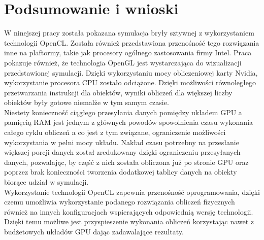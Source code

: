 \chapter{Podsumowanie i wnioski}

W ninejszej pracy została pokazana symulacja bryły sztywnej z wykorzystaniem technologii OpenCL. Została również przedstawiona przenośność tego rozwiązania inne na plaftormy, takie jak procesory ogólnego zastosowania firmy Intel. Praca pokazuje również, że technologia OpenGL jest wystarczająca do wizualizacji przedstawionej symulacji. 
Dzięki wykorzystaniu mocy obliczeniowej karty Nvidia, wykorzystanie procesora CPU zostało odciążone. Dzięki możliwości równoległego przetwarzania instrukcji dla obiektów, wyniki obliczeń dla większej liczby obiektów były gotowe niemalże w tym samym czasie.\\
Niestety konieczność ciągłego przesyłania danych pomiędzy układem GPU a pamięcią RAM jest jednym z głównych powodów spowolnienia czasu wykonania całego cyklu obliczeń a co jest z tym związane, ograniczenie możliwości wykorzystania w pełni mocy układu. Nakład czasu potrzebny na przesłanie większej porcji danych został zredukowany dzięki ograniczeniu przesyłanych danych, pozwalając, by część z nich została obliczona już po stronie GPU oraz poprzez brak konieczności tworzenia dodatkowej tablicy danych na obiekty biorące udział w symulacji. \\
Wykorzystanie technologii OpenCL zapewnia przenośność oprogramowania, dzięki czemu umożliwia wykorzystanie podanego rozwiązania obliczeń fizycznych również na innych konfiguracjach wspierających odpowiednią wersję technologii. Dzięki temu możliwe jest przyspieszenie wykonania obliczeń korzystając nawet z budżetowych układów GPU dając zadawalające rezultaty.\\